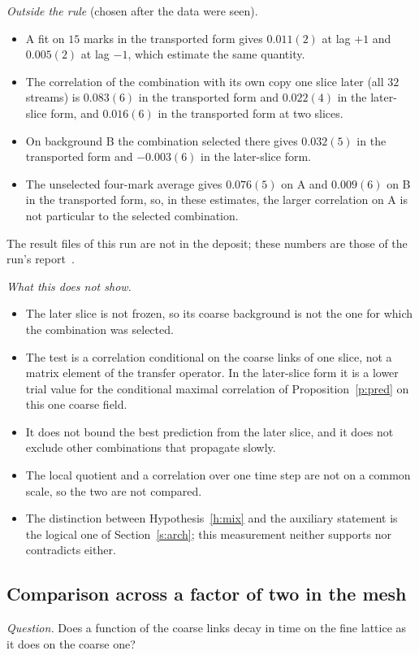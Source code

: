 \emph{Outside the rule} (chosen after the data were seen).
\begin{itemize}
\item A fit on $15$ marks in the transported form gives $0.011(2)$ at lag $+1$ and $0.005(2)$ at lag $-1$,
which estimate the same quantity.
\item The correlation of the combination with its own copy one slice later (all $32$ streams) is $0.083(6)$
in the transported form and $0.022(4)$ in the later-slice form, and $0.016(6)$ in the transported form at two
slices.
\item On background \textsf{B} the combination selected there gives $0.032(5)$ in the transported form and
$-0.003(6)$ in the later-slice form.
\item The unselected four-mark average gives $0.076(5)$ on \textsf{A} and $0.009(6)$ on \textsf{B} in the transported form, so,
in these estimates, the larger correlation on \textsf{A} is not particular to the selected combination.
\end{itemize}
The result files of this run are not in the deposit; these numbers are those of the run's
report~\cite{RepoData}.

\emph{What this does not show.}
\begin{itemize}
\item The later slice is not frozen, so its coarse background is not the one for which the combination was
selected.
\item The test is a correlation conditional on the coarse links of one slice, not a matrix element of the
transfer operator. In the later-slice form it is a lower trial value for the conditional maximal correlation
of Proposition~\ref{p:pred} on this one coarse field.
\item It does not bound the best prediction from the later slice, and it does not exclude other combinations
that propagate slowly.
\item The local quotient and a correlation over one time step are not on a common scale, so the two are not
compared.
\item The distinction between Hypothesis~\ref{h:mix} and the auxiliary statement is the logical one of
Section~\ref{s:arch}; this measurement neither supports nor contradicts either.
\end{itemize}

\subsection{Comparison across a factor of two in the mesh}\label{s:cross}
\emph{Question.} Does a function of the coarse links decay in time on the fine lattice as it does on the
coarse one?

